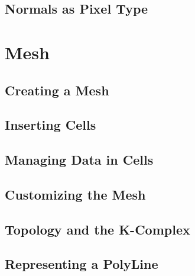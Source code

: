 



\subsection{Normals as Pixel Type}
\label{sec:PointSetWithCovariantVectorsAsPixelType}






\section{Mesh}\label{MeshSection}

\subsection{Creating a Mesh}
\label{sec:CreatingAMesh}




\subsection{Inserting Cells}
\label{sec:InsertingCellsInMesh}




\subsection{Managing Data in Cells}
\label{sec:ManagingCellDataInMesh}




\subsection{Customizing the Mesh}
\label{sec:CustomizingTheMesh}




\subsection{Topology and the K-Complex}
\label{sec:MeshKComplex}




\subsection{Representing a PolyLine}
\label{sec:MeshPolyLine}

